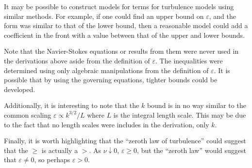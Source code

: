 \documentclass[ccbysa,note,git]{bmtreport}
\begin{document}
It may be possible to construct models for terms for turbulence models using similar methods. For example, if one could find an upper bound on $\varepsilon$, and the form was similar to that of the lower bound, then a reasonable model could add a coefficient in the front with a value between that of the upper and lower bounds.

Note that the Navier-Stokes equations or results from them were never used in the derivations above aside from the definition of $\varepsilon$. The inequalities were determined using only algebraic manipulations from the definition of $\varepsilon$. It is possible that by using the governing equations, tighter bounds could be developed.

Additionally, it is interesting to note that the $k$ bound is in no way similar to the common scaling $\varepsilon \varpropto k^{3/2} / L$ where $L$ is the integral length scale. This may be due to the fact that no length scales were includes in the derivation, only $k$.

Finally, it is worth highlighting that the ``zeroth law of turbulence'' could suggest that the $\geq$ is actually a $>$. As $\nu \downarrow 0$, $\varepsilon \geq 0$, but the ``zeroth law'' would suggest that $\varepsilon \neq 0$, so perhaps $\varepsilon > 0$.

\end{document}
